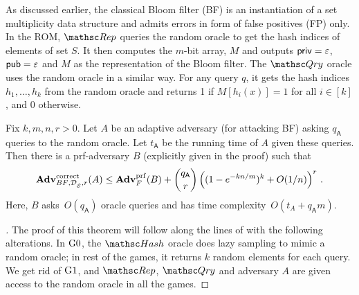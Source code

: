 As discussed earlier, the classical Bloom filter (BF) is an instantiation of a set multiplicity data structure and admits errors in form of false  positives (FP) only. In the ROM, $\Rep$ queries the random oracle to get the hash indices of elements of set $S$. It then computes the $m$-bit array, $M$ and outputs ${\sf priv}=\varepsilon$, ${\sf pub} = \varepsilon$ and $M$ as the representation of
the Bloom filter. The $\Qry$ oracle uses the random oracle in a similar way. For any query $q$, it gets the hash indices $h_1, \ldots, h_k$ from the random oracle and returns 1 if $M[h_i(x)]=1$ for all $i\in [k]$, and 0 otherwise.
\begin{theorem}\label{thm3}
Fix $k,m,n,r>0$. Let $A$ be an adaptive adversary (for attacking BF) asking $q_\mathsf{A}$ queries to the random oracle. Let $t_\mathsf{A}$ be the running time of $A$ given these queries. Then there is a prf-adversary  $B$ (explicitly given in the proof) such that
\[
\mathrm{\mathbf{Adv}}^{\mathrm{correct}}_{{BF},\mathcal{D}_{{\cal S}}^{},r}(A) \leq  \mathbf{Adv}^{\mathrm{prf}}_{F}(B)  +{\dbinom{q_\mathsf{A}}{r}} \left( (1-e^{-kn/m})^k + O(1/n) \right)^r\,.
\]
Here, $B$ asks~$O(q_\mathsf{A})$ oracle queries and has time complexity~$O(t_A+q_\mathsf{A}m)$.
\end{theorem}

\begin{proof}[]
The proof of this theorem will follow along the lines of  with the following alterations. In $\text{G0}$, the $\Hash$ oracle does lazy sampling to mimic a random oracle; in rest of the games, it returns $k$ random elements for each query. We get rid of $\text{G1}$, and $\Rep$, $\Qry$ and adversary $A$ are given access to the random oracle in all the games. 
\end{proof}
